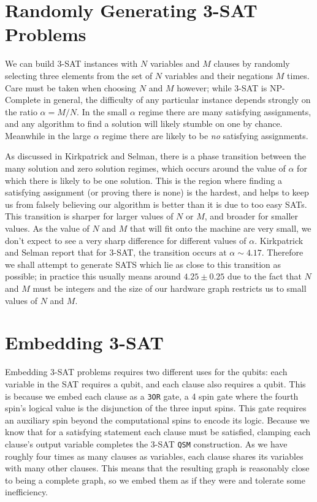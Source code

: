 \section{Randomly Generating 3-SAT Problems}
We can build 3-SAT instances with $N$ variables and $M$ clauses by randomly selecting three elements from the set of $N$ variables and their negations $M$ times.  Care must be taken when choosing $N$ and $M$ however; while 3-SAT is NP-Complete in general, the difficulty of any particular instance depends strongly on the ratio $\alpha = M/N$\cite{Kirkpatrick}.  In the small $\alpha$ regime there are many satisfying assignments, and any algorithm to find a solution will likely stumble on one by chance.  Meanwhile in the large $\alpha$ regime there are likely to be \emph{no} satisfying assignments.

As discussed in Kirkpatrick and Selman\cite{Kirkpatrick}, there is a phase transition between the many solution and zero solution regimes, which occurs around the value of $\alpha$ for which there is likely to be one solution.  This is the region where finding a satisfying assignment (or proving there is none) is the hardest, and helps to keep us from falsely believing our algorithm is better than it is due to too easy SATs.  This transition is sharper for larger values of $N$ or $M$, and broader for smaller values.  As the value of $N$ and $M$ that will fit onto the \machine machine are very small, we don't expect to see a very sharp difference for different values of $\alpha$.  Kirkpatrick and Selman report that for 3-SAT, the transition occurs at $\alpha \sim 4.17$.  Therefore we shall attempt to generate SATS which lie as close to this transition as possible; in practice this usually means around $4.25 \pm 0.25$ due to the fact that $N$ and $M$ must be integers and the size of our hardware graph restricts us to small values of $N$ and $M$.

\section{Embedding 3-SAT}
Embedding 3-SAT problems requires two different uses for the qubits: each variable in the SAT requires a qubit, and each clause also requires a qubit.  This is because we embed each clause as a \texttt{3OR} gate, a 4 spin gate where the fourth spin's logical value is the disjunction of the three input spins.  This gate requires an auxiliary spin beyond the computational spins to encode its logic.  Because we know that for a satisfying statement each clause must be satisfied, clamping each clause's output variable completes the 3-SAT \texttt{QSM} construction.  As we have roughly four times as many clauses as variables, each clause shares its variables with many other clauses.  This means that the resulting graph is reasonably close to being a complete graph, so we embed them as if they were and tolerate some inefficiency. 


